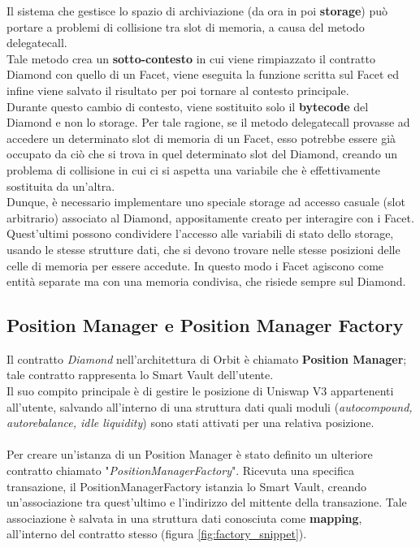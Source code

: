 \documentclass[12pt,a4paper]{report}
\begin{document}
\noindent Il sistema che gestisce lo spazio di archiviazione (da ora in poi \textbf{storage}) può portare a problemi di collisione tra slot di memoria, a causa del metodo delegatecall.
\\Tale metodo crea un \textbf{sotto-contesto} in cui viene rimpiazzato il contratto Diamond con quello di un Facet, viene eseguita la funzione scritta sul Facet ed infine viene salvato il risultato per poi tornare al contesto principale. 
\\Durante questo cambio di contesto, viene sostituito solo il \textbf{bytecode} del Diamond e non lo storage. Per tale ragione, se il metodo delegatecall provasse ad accedere un determinato slot di memoria di un Facet, esso potrebbe essere già occupato da ciò che si trova in quel determinato slot del Diamond, creando un problema di collisione in cui ci si aspetta una variabile che è effettivamente sostituita da un'altra.\\Dunque, è necessario implementare uno speciale storage ad accesso casuale (slot arbitrario) associato al Diamond, appositamente creato per interagire con i Facet.
\\Quest'ultimi possono condividere l'accesso alle variabili di stato dello storage, usando le stesse strutture dati, che si devono trovare nelle stesse posizioni delle celle di memoria per essere accedute. In questo modo i Facet agiscono come entità separate ma con una memoria condivisa, che risiede sempre sul Diamond.





\subsection{Position Manager e Position Manager Factory}

Il contratto \textit{Diamond} nell'architettura di Orbit è chiamato \textbf{Position Manager}; tale contratto rappresenta lo Smart Vault dell'utente.\\Il suo compito principale è di gestire le posizione di Uniswap V3 appartenenti all'utente, salvando all'interno di una struttura dati quali moduli (\textit{autocompound, autorebalance, idle liquidity}) sono stati attivati per una relativa posizione.
\\\\Per creare un'istanza di un Position Manager è stato definito un ulteriore contratto chiamato "\textit{PositionManagerFactory}". Ricevuta una specifica transazione, il PositionManagerFactory istanzia lo Smart Vault, creando un'associazione tra quest'ultimo e l'indirizzo del mittente della transazione. Tale associazione è salvata in una struttura dati conosciuta come \textbf{mapping}, all'interno del contratto stesso (figura \ref{fig:factory_snippet}). 
\end{document}
